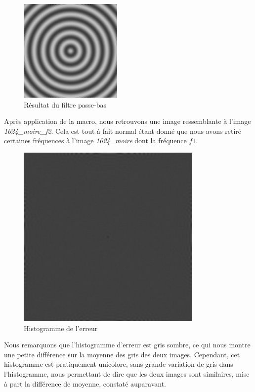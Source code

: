 \documentclass[a4paper,11pt]{article}
\begin{document}
  \begin{figure}[H]
  \centering
   \includegraphics[width=5cm]{../1024_moire_hf.png}
   \caption{Résultat du filtre passe-bas}
  \end{figure}
  
  Après application de la macro, nous retrouvons une image ressemblante à l'image 
  \textit{1024\_moire\_f2}. Cela est tout à fait normal étant donné que nous avons 
  retiré certaines fréquences à l'image \textit{1024\_moire} dont la fréquence $f1$.\\
  
  \begin{figure}[H]
    \centering
    \includegraphics[width=9cm]{../1024_moire_sub.png}
    \caption{Histogramme de l'erreur}
  \end{figure}
  
  Nous remarquons que l'histogramme d'erreur est gris sombre, ce qui nous montre une 
  petite différence sur la moyenne des gris des deux images. Cependant, cet histogramme 
  est pratiquement unicolore, sans grande variation de gris dans l'histogramme, nous 
  permettant de dire que les deux images sont similaires, mise à part la différence de 
  moyenne, constaté auparavant.\\
  
\end{document}

